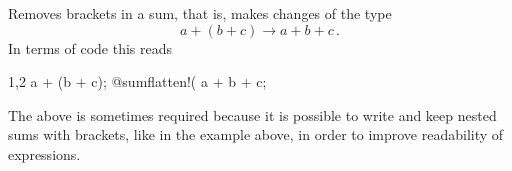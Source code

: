 
Removes brackets in a sum, that is, makes changes of the type
\begin{equation}
a+(b+c) \rightarrow a+b+c\, .
\end{equation}
In terms of code this reads
\begin{screen}{1,2}
a + (b + c);
@sumflatten!(%
a + b + c;
\end{screen}
The above is sometimes required because it is possible to write and
keep nested sums with brackets, like in the example above, in order to
improve readability of expressions.  


